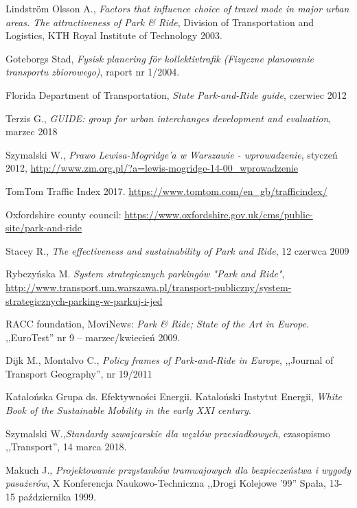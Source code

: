 \begin{thebibliography}{99}
	Lindström Olsson A.,	\emph{Factors that influence choice of travel mode in major urban areas. The attractiveness of Park \& Ride},
	Division of Transportation and Logistics, KTH Royal Institute of Technology 2003.
	
	Goteborgs Stad,
	\emph{Fysisk planering för kollektivtrafik (Fizyczne planowanie transportu zbiorowego)},
	raport nr 1/2004.
	
	Florida Department of Transportation,	\emph{State Park-and-Ride guide}, czerwiec 2012
	
	Terzis G.,	\emph{GUIDE: group for urban interchanges development and evaluation},	marzec 2018
	
	Szymalski W.,	\emph{Prawo Lewisa-Mogridge’a w Warszawie - wprowadzenie}, styczeń 2012,
	\url{http://www.zm.org.pl/?a=lewis-mogridge-14-00_wprowadzenie}
	
	TomTom Traffic Index 2017.
	\url{https://www.tomtom.com/en_gb/trafficindex/}
	
	Oxfordshire county council:
	\url{https://www.oxfordshire.gov.uk/cms/public-site/park-and-ride}
	
	Stacey R.,
	\emph{The effectiveness and sustainability of Park and Ride},
	12 czerwca 2009
	
	Rybczyńska M.
	\emph{System strategicznych parkingów "Park and Ride"},
	\url{http://www.transport.um.warszawa.pl/transport-publiczny/system-strategicznych-parking-w-parkuj-i-jed}
	
	RACC foundation, MoviNews:
	\emph{Park \& Ride; State of the Art in Europe}. ,,EuroTest'' nr 9 -- marzec/kwiecień 2009.
	
	Dijk M., Montalvo C.,	\emph{Policy frames of Park-and-Ride in Europe},	,,Journal of Transport Geography'', nr 19/2011
	
	Katalońska Grupa ds. Efektywności Energii. Kataloński Instytut Energii,
	\emph{White Book of the Sustainable Mobility in the early XXI century}.
	
	Szymalski W.,\emph{Standardy szwajcarskie dla węzłów przesiadkowych}, czasopismo ,,Transport'', 14 marca 2018.
	
	Makuch J., \emph{Projektowanie przystanków tramwajowych dla bezpieczeństwa i wygody pasażerów}, X Konferencja Naukowo-Techniczna ,,Drogi Kolejowe '99'' Spała, 13-15 października 1999.
	

\end{thebibliography}
